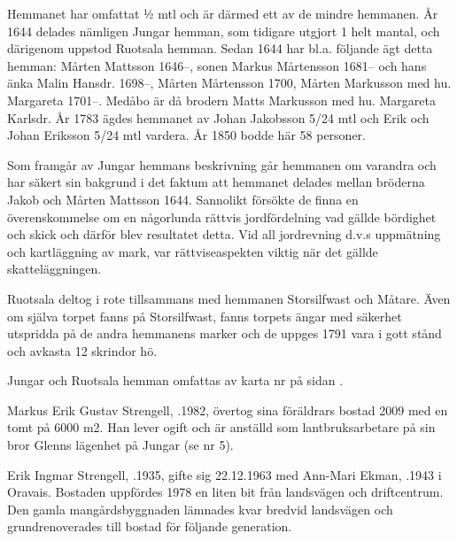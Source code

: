 Hemmanet har omfattat ½ mtl och är därmed ett av de mindre hemmanen. År 1644 delades nämligen Jungar hemman, som tidigare utgjort 1 helt mantal, och därigenom uppstod Ruotsala hemman. Sedan 1644 har bl.a. följande ägt detta hemman:
Mårten Mattsson 1646--, sonen Markus Mårtensson 1681-- och hans änka Malin Hansdr. 1698--, Mårten Mårtensson  1700, Mårten Markusson med hu. Margareta 1701--. Medåbo är då brodern Matts Markusson med hu. Margareta Karlsdr. År 1783 ägdes hemmanet av Johan Jakobsson 5/24 mtl och Erik och Johan Eriksson 5/24 mtl vardera. År 1850 bodde här 58 personer.

Som framgår av Jungar hemmans beskrivning går hemmanen om varandra och har säkert sin bakgrund i det faktum att hemmanet delades mellan bröderna Jakob och Mårten Mattsson 1644. Sannolikt försökte de finna en överenskommelse om en någorlunda rättvis jordfördelning vad gällde bördighet och skick och därför blev resultatet detta. Vid all jordrevning d.v.s uppmätning och kartläggning av mark, var rättviseaspekten viktig när det gällde skatteläggningen.

Ruotsala deltog i rote tillsammans med hemmanen Storsilfwast och Måtare. Även om själva torpet fanns på Storsilfwast, fanns torpets ängar med säkerhet utspridda på de andra hemmanens marker och de uppges 1791 vara i gott stånd och avkasta 12 skrindor hö.


Jungar och Ruotsala hemman omfattas av karta nr  på sidan \pageref{map:13}.




%


%


%
Markus Erik Gustav Strengell, .1982, övertog sina föräldrars bostad 2009 med en tomt på 6000 m2. Han lever ogift och är anställd som lantbruksarbetare på sin bror Glenns lägenhet på Jungar (se nr 5).\jhvspace{}



%
Erik Ingmar Strengell, .1935, gifte sig 22.12.1963 med Ann-Mari Ekman, .1943 i Oravais. Bostaden uppfördes 1978 en liten bit från landsvägen och driftcentrum. Den gamla mangårdsbyggnaden lämnades kvar bredvid landsvägen och grundrenoverades till bostad för följande generation.\jhvspace{}




